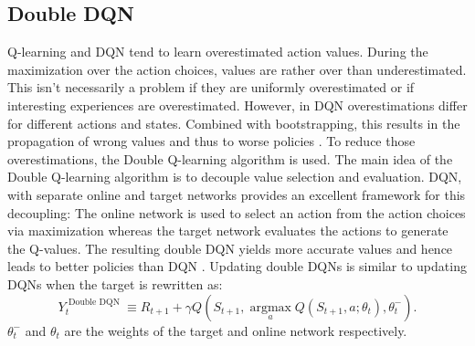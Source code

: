 \subsection{Double DQN}
Q-learning  and DQN tend to learn overestimated action values. During the maximization over the action choices, values are rather over than underestimated.
This isn't necessarily a problem if they are uniformly overestimated or if interesting experiences are overestimated. However, in DQN overestimations differ for different actions and states. Combined with bootstrapping, this results in the propagation of wrong values and thus to worse policies \cite{DBLP:journals/corr/HasseltGS15}. To reduce those overestimations, the Double Q-learning algorithm \cite{DBLP:journals/corr/HasseltGS15} is used. 
The main idea of the Double Q-learning algorithm is to decouple value selection and evaluation.
DQN, with separate online and target networks provides an excellent framework for this decoupling:
The online network is used to select an action from the action choices via maximization whereas the target network evaluates the actions to generate the Q-values.
The resulting double DQN yields more accurate values and hence leads to better policies than DQN \cite{DBLP:journals/corr/HasseltGS15}.
Updating double DQNs is similar to updating DQNs when the target is rewritten as:
\begin{equation}
Y_{t}^{\text { Double DQN }} \equiv R_{t+1}+\gamma Q\left(S_{t+1}, \underset{a}{\operatorname{argmax}} Q\left(S_{t+1}, a ; \theta_{t}\right), \theta_{t}^{-}\right).
\end{equation}
$\theta_{t}^{-}$ and $\theta_{t}$ are the weights of the target and online network respectively.
